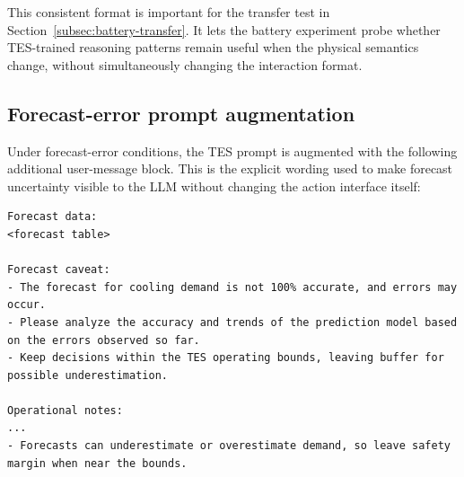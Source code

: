 \documentclass[11pt]{article}
\begin{document}
This consistent format is important for the transfer test in Section~\ref{subsec:battery-transfer}. It lets the battery experiment probe whether TES-trained reasoning patterns remain useful when the physical semantics change, without simultaneously changing the interaction format.

\subsection{Forecast-error prompt augmentation}
Under forecast-error conditions, the TES prompt is augmented with the following additional user-message block. This is the explicit wording used to make forecast uncertainty visible to the LLM without changing the action interface itself:
\begin{lstlisting}[style=promptblock]
Forecast data:
<forecast table>

Forecast caveat:
- The forecast for cooling demand is not 100% accurate, and errors may occur.
- Please analyze the accuracy and trends of the prediction model based on the errors observed so far.
- Keep decisions within the TES operating bounds, leaving buffer for possible underestimation.

Operational notes:
...
- Forecasts can underestimate or overestimate demand, so leave safety margin when near the bounds.
\end{lstlisting}
\end{document}
